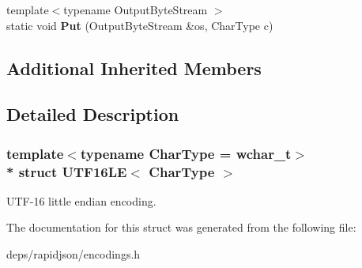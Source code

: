 \begin{DoxyCompactItemize}
\item 
{\footnotesize template$<$typename Output\+Byte\+Stream $>$ }\\static void {\bfseries Put} (Output\+Byte\+Stream \&os, Char\+Type c)\hypertarget{struct_u_t_f16_l_e_ac018cc43a1dba5a6ca232bd9a257072c}{}\label{struct_u_t_f16_l_e_ac018cc43a1dba5a6ca232bd9a257072c}

\end{DoxyCompactItemize}
\subsection*{Additional Inherited Members}


\subsection{Detailed Description}
\subsubsection*{template$<$typename Char\+Type = wchar\+\_\+t$>$\\*
struct U\+T\+F16\+L\+E$<$ Char\+Type $>$}

U\+T\+F-\/16 little endian encoding. 

The documentation for this struct was generated from the following file\+:\begin{DoxyCompactItemize}
\item 
deps/rapidjson/encodings.\+h\end{DoxyCompactItemize}
